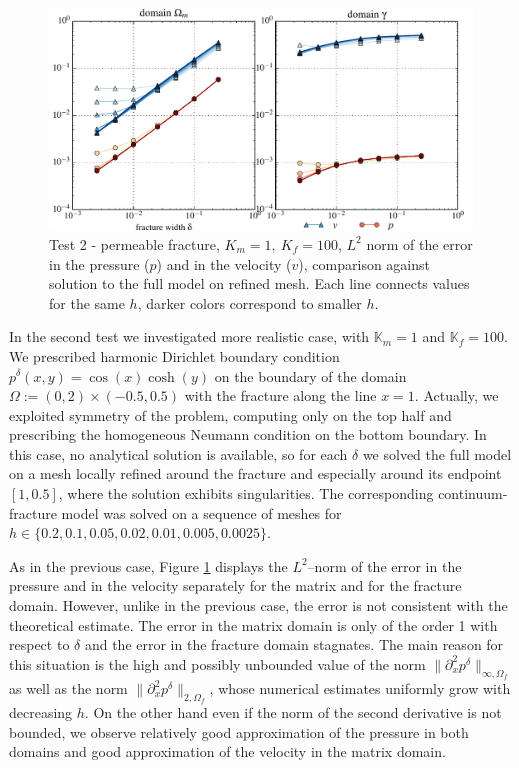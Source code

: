 \documentclass{llncs}
\def\prtl{\partial}
\def\tn#1{{\mathbb{#1}}}    %
\def\norm#1{\|#1\|}
\begin{document}
\begin{figure}
\centering
\includegraphics[scale=0.6]{figures/plot_num_cos_cosh_color.pdf}
\caption{Test 2 - permeable fracture, $K_m=1,\ K_f=100$, $L^2$ norm of the error in the pressure ($p$) and in the velocity ($v$), 
         comparison against solution to the full model on refined mesh.
         Each line connects values for the same $h$, darker colors correspond to smaller $h$.}
\label{fig:cos_cosh}
\end{figure}


In the second test we investigated more realistic case, with $\tn K_m=1$ and $\tn K_f=100$. We prescribed harmonic Dirichlet boundary condition 
$p^\delta(x,y) = \cos(x)\cosh(y)$ on the boundary of the domain $\Omega:=(0,2)\times(-0.5,0.5)$ with the fracture along the line $x=1$.
Actually, we exploited symmetry of the problem, computing only on the top half and prescribing the homogeneous 
Neumann condition on the bottom boundary. In this case, no analytical solution is available, so for each $\delta$
we solved the full model on a mesh locally refined 
around the fracture and especially around its endpoint $[1, 0.5]$, where the solution exhibits singularities.
The corresponding continuum-fracture model was solved 
on a sequence of meshes for $h\in\{0.2, 0.1, 0.05, 0.02, 0.01, 0.005, 0.0025\}$.

As in the previous case, Figure \ref{fig:cos_cosh} displays the $L^2$--norm of the error in the pressure and in the velocity separately for 
the matrix and for the fracture domain. However, unlike in the previous case, the error is not consistent with the theoretical estimate. 
The error in the matrix domain is only of the order 1 with respect to $\delta$ and the error in the fracture domain stagnates.
The main reason for this situation is the high and possibly unbounded value of the norm 
$\norm{\prtl^2_x p^\delta}_{\infty,\Omega_f}$
as well as the norm $\norm{\prtl^2_x p^\delta}_{2,\Omega_f}$,
whose numerical estimates uniformly grow with decreasing $h$.
On the other hand even if the norm of the second derivative is not bounded, we observe relatively good approximation of the pressure in both domains
and good approximation of the velocity in the matrix domain.
\end{document}
